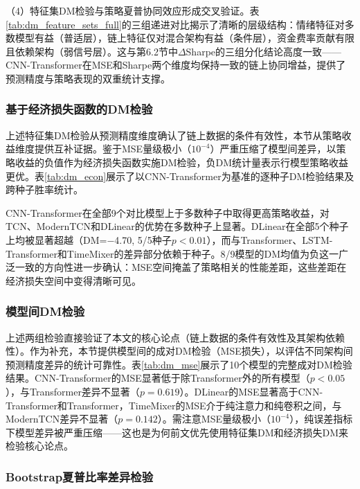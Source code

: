 \documentclass[12pt,a4paper]{ctexart}
\begin{document}
（4）特征集DM检验与策略夏普协同效应形成交叉验证。表\ref{tab:dm_feature_sets_full}的三组递进对比揭示了清晰的层级结构：情绪特征对多数模型有益（普适层），链上特征仅对混合架构有益（条件层），资金费率贡献有限且依赖架构（弱信号层）。这与第6.2节中$\Delta$Sharpe的三组分化结论高度一致——CNN-Transformer在MSE和Sharpe两个维度均保持一致的链上协同增益，提供了预测精度与策略表现的双重统计支撑。

\subsubsection{基于经济损失函数的DM检验}

上述特征集DM检验从预测精度维度确认了链上数据的条件有效性，本节从策略收益维度提供互补证据。鉴于MSE量级极小（$10^{-4}$）严重压缩了模型间差异，以策略收益的负值作为经济损失函数实施DM检验，负DM统计量表示行模型策略收益更优。表\ref{tab:dm_econ}展示了以CNN-Transformer为基准的逐种子DM检验结果及跨种子胜率统计。



CNN-Transformer在全部9个对比模型上于多数种子中取得更高策略收益，对TCN、ModernTCN和DLinear的优势在多数种子上显著。DLinear在全部5个种子上均被显著超越（DM=$-$4.70, 5/5种子$p<0.01$），而与Transformer、LSTM-Transformer和TimeMixer的差异部分依赖于种子。8/9模型的DM均值为负这一广泛一致的方向性进一步确认：MSE空间掩盖了策略相关的性能差距，这些差距在经济损失空间中变得清晰可见。

\subsubsection{模型间DM检验}

上述两组检验直接验证了本文的核心论点（链上数据的条件有效性及其架构依赖性）。作为补充，本节提供模型间的成对DM检验\cite{diebold1995}（MSE损失），以评估不同架构间预测精度差异的统计可靠性。表\ref{tab:dm_mse}展示了10个模型的完整成对DM检验结果。CNN-Transformer的MSE显著低于除Transformer外的所有模型（$p<0.05$），与Transformer差异不显著（$p=0.619$）。DLinear的MSE显著高于CNN-Transformer和Transformer，TimeMixer的MSE介于纯注意力和纯卷积之间，与ModernTCN差异不显著（$p=0.142$）。需注意MSE量级极小（$10^{-4}$），纯误差指标下模型差异被严重压缩——这也是为何前文优先使用特征集DM和经济损失DM来检验核心论点。



\subsubsection{Bootstrap夏普比率差异检验}
\end{document}
